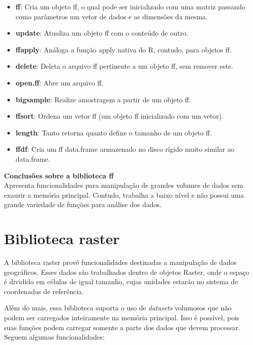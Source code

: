 \documentclass[12pt]{article}
\begin{document}
\begin{itemize}
\item \textbf{ff}: Cria um objeto ff, o qual pode ser inicializado com uma matriz passando como parâmetros um vetor de dados e as dimensões da mesma.
\item \textbf{update}: Atualiza um objeto ff com o conteúdo de outro.
\item \textbf{ffapply}: Análoga a função apply nativa do R, contudo, para objetos ff.
\item \textbf{delete}: Deleta o arquivo ff pertinente a um objeto ff, sem remover este.
\item \textbf{open.ff}: Abre um arquivo ff.
\item \textbf{bigsample}: Realize amostragem a partir de um objeto ff.
\item \textbf{ffsort}: Ordena um vetor ff (um objeto ff inicializado com um vetor).
\item \textbf{length}: Tanto retorna quanto define o tamanho de um objeto ff.
\item \textbf{ffdf}: Cria um ff data.frame armazenado no disco rígido muito similar ao data.frame.
\end{itemize}

\textbf{Conclusões sobre a biblioteca ff}\\

Apresenta funcionalidades para manipulação de grandes volumes de dados sem exaurir a memória principal. Contudo, trabalha a baixo nível e não possui uma grande variedade de funções para análise dos dados.


\section{Biblioteca raster}

A biblioteca raster provê funcionalidades destinadas a manipulação de dados geográficos. Esses dados são trabalhados dentro de objetos Raster, onde o espaço é dividido em células de igual tamanho, cujas unidades estarão no sistema de coordenadas de referência. 

Além do mais, essa biblioteca suporta o uso de \textit{datasets} volumosos que não podem ser carregados inteiramente na memória principal. Isso é possível, pois suas funções podem carregar somente a parte dos dados que devem processar. Seguem algumas funcionalidades:
\end{document}
